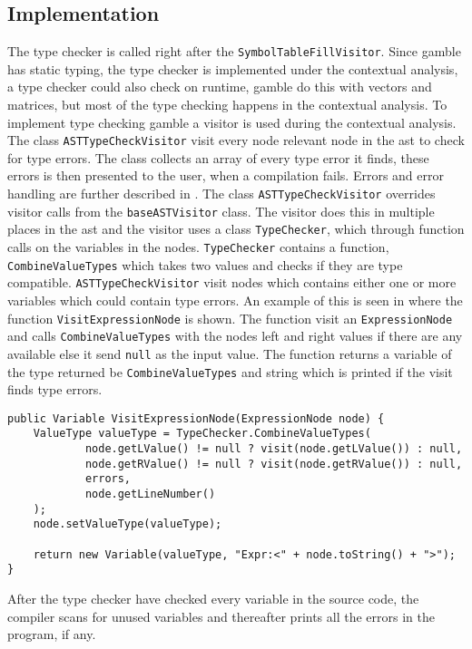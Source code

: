 \subsection*{Implementation}
The type checker is called right after the \texttt{SymbolTableFillVisitor}.
Since \gls{gamble} has static typing, the type checker is implemented under the contextual analysis, a type checker could also check on runtime, \gls{gamble} do this with vectors and matrices, but most of the type checking happens in the contextual analysis.
To implement type checking \gls{gamble} a visitor is used during the contextual analysis.
The class \texttt{ASTTypeCheckVisitor} visit every node relevant node in the \acrshort{ast} to check for type errors.
The class collects an array of every type error it finds, these errors is then presented to the user, when a compilation fails.
Errors and error handling are further described in .
The class \texttt{ASTTypeCheckVisitor} overrides visitor calls from the \texttt{baseASTVisitor} class.
The visitor does this in multiple places in the \acrshort{ast} and the visitor uses a class \texttt{TypeChecker}, which through function calls on the variables in the nodes.
\texttt{TypeChecker} contains a function, \texttt{CombineValueTypes} which takes two values and checks if they are type compatible.
\texttt{ASTTypeCheckVisitor} visit nodes which contains either one or more variables which could contain type errors.
An example of this is seen in  where the function \texttt{VisitExpressionNode}
 is shown.
The function visit an \texttt{ExpressionNode} and calls \texttt{CombineValueTypes} with the nodes left and right values if there are any available else it send \texttt{null} as the input value.
The function returns a variable of the type returned be \texttt{CombineValueTypes} and string which is printed if the visit finds type errors.

\begin{lstlisting}[caption=The VisitExprressionNode function in the ASTTypeChecker class,numbers=none,frame=tlrb,label={lst:typecheck1}]
public Variable VisitExpressionNode(ExpressionNode node) {
    ValueType valueType = TypeChecker.CombineValueTypes(
            node.getLValue() != null ? visit(node.getLValue()) : null,
            node.getRValue() != null ? visit(node.getRValue()) : null,
            errors,
            node.getLineNumber()
    );
    node.setValueType(valueType);

    return new Variable(valueType, "Expr:<" + node.toString() + ">");
}
\end{lstlisting}

After the type checker have checked every variable in the source code, the compiler scans for unused variables and thereafter prints all the errors in the program, if any.